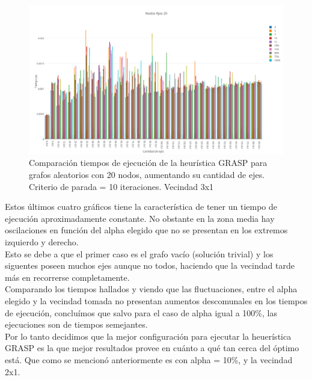   \begin{figure}[h!]
   \begin{center}
 	\includegraphics[scale=0.35]{imagenes/grasp/20nodos-10repes-v2.png}
 	\caption{Comparaci\'on tiempos de ejecuci\'on de la heur\'istica GRASP para grafos aleatorios con 20 nodos, aumentando su cantidad de ejes. Criterio de parada = 10 iteraciones. Vecindad 3x1}
   \end{center}
 \end{figure}
\newpage

Estos \'ultimos cuatro gr\'aficos tiene la caracter\'istica de tener un tiempo de ejecuci\'on aproximadamente constante. No obstante en la zona media hay oscilaciones en funci\'on del alpha elegido que no se presentan en los extremos izquierdo y derecho.\\

Esto se debe a que el primer caso es el grafo vac\'io (soluci\'on trivial) y los siguentes poseen muchos ejes aunque no todos, haciendo que la vecindad tarde m\'as en recorrerse completamente.\\

Comparando los tiempos hallados y viendo que las fluctuaciones, entre el alpha elegido y la vecindad tomada no presentan aumentos descomunales en los tiempos de ejecuci\'on, conclu\'imos que salvo para el caso de alpha igual a 100\%, las ejecuciones son de tiempos semejantes.\\

Por lo tanto decidimos que la mejor configuraci\'on para ejecutar la heuer\'istica GRASP es la que mejor resultados provee en cu\'anto a qu\'e tan cerca del \'optimo est\'a. Que como se mencion\'o anteriormente es con alpha = 10\%, y la vecindad 2x1.\\


